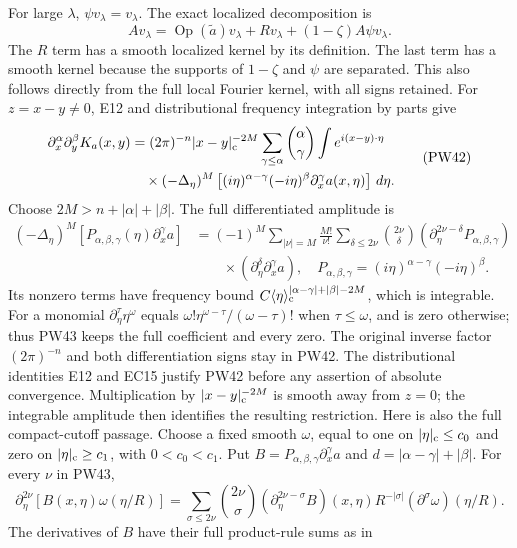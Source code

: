 \documentclass[
  11pt,
]{article}
\begin{document}
For large \(\lambda\), \(\psi v_\lambda=v_\lambda\). The exact localized
decomposition is \[
 Av_\lambda
    =\operatorname{Op}(\widetilde a)v_\lambda
      +Rv_\lambda+(1-\zeta)A\psi v_\lambda .
 \tag{PW41}
\] The \(R\) term has a smooth localized kernel by its definition. The
last term has a smooth kernel because the supports of \(1-\zeta\) and
\(\psi\) are separated. This also follows directly from the full local
Fourier kernel, with all signs retained. For \(z=x-y\ne0\), E12 and
distributional frequency integration by parts give \[
 \begin{split}
 \partial_x^\alpha\partial_y^\beta K_a(x,y)
 &=(2\pi)^{-n}|x-y|_{\rm c}^{-2M}
   \sum_{\gamma\leq\alpha}{\alpha\choose\gamma}
   \int e^{i(x-y)\cdot\eta}\\
 &\quad{}\times(-\Delta_\eta)^M
       \left[(i\eta)^{\alpha-\gamma}(-i\eta)^\beta
                   \partial_x^\gamma a(x,\eta)\right]\,d\eta .
 \end{split}
 \tag{PW42}
\] Choose \(2M>n+|\alpha|+|\beta|\). The full differentiated amplitude
is \[
 \begin{split}
 (-\Delta_\eta)^M
       [P_{\alpha,\beta,\gamma}(\eta)\partial_x^\gamma a]
 &=(-1)^M\sum_{|\nu|=M}\frac{M!}{\nu!}
       \sum_{\delta\leq2\nu}{2\nu\choose\delta}
       (\partial_\eta^{2\nu-\delta}
                          P_{\alpha,\beta,\gamma})\\
 &\qquad{}\times
       (\partial_\eta^\delta\partial_x^\gamma a),
 \quad
 P_{\alpha,\beta,\gamma}
       =(i\eta)^{\alpha-\gamma}(-i\eta)^\beta .
 \end{split}
 \tag{PW43}
\] Its nonzero terms have frequency bound
\(C\langle\eta\rangle_{\rm c}^{|\alpha-\gamma|+|\beta|-2M}\), which is
integrable. For a monomial \(\partial_\eta^\tau\eta^\omega\) equals
\(\omega!\eta^{\omega-\tau}/(\omega-\tau)!\) when \(\tau\leq\omega\),
and is zero otherwise; thus PW43 keeps the full coefficient and every
zero. The original inverse factor \((2\pi)^{-n}\) and both
differentiation signs stay in PW42. The distributional identities E12
and EC15 justify PW42 before any assertion of absolute convergence.
Multiplication by \(|x-y|_{\rm c}^{-2M}\) is smooth away from \(z=0\);
the integrable amplitude then identifies the resulting restriction. Here
is also the full compact-cutoff passage. Choose a fixed smooth
\(\omega\), equal to one on \(|\eta|_{\rm c}\leq c_0\) and zero on
\(|\eta|_{\rm c}\geq c_1\), with \(0<c_0<c_1\). Put
\(B=P_{\alpha,\beta,\gamma}\partial_x^\gamma a\) and
\(d=|\alpha-\gamma|+|\beta|\). For every \(\nu\) in PW43, \[
 \partial_\eta^{2\nu}[B(x,\eta)\omega(\eta/R)]
 =\sum_{\sigma\leq2\nu}{2\nu\choose\sigma}
      (\partial_\eta^{2\nu-\sigma}B)(x,\eta)
      R^{-|\sigma|}(\partial^\sigma\omega)(\eta/R).
 \tag{PW43a}
\] The derivatives of \(B\) have their full product-rule sums as in
\end{document}
